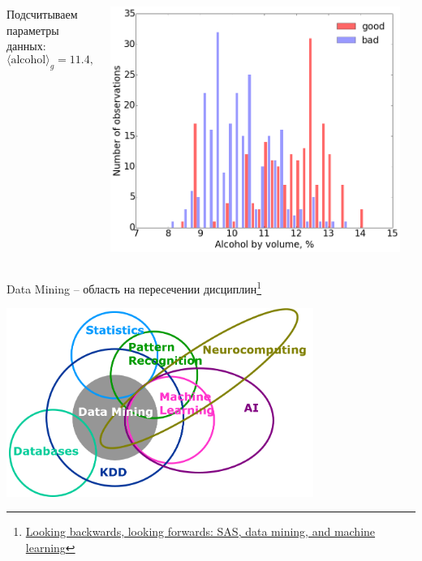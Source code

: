 \documentclass[aspectratio=169]{beamer}
\begin{document}
\begin{frame}
\begin{columns}[c]
\begin{column}{.49\linewidth}
\begin{footnotesize}
\begin{overprint}
			  Подсчитываем параметры данных: \[\langle \text{alcohol} \rangle_g = 11.4,\; \langle \text{alcohol} \rangle_b = 10.2\]
		\end{overprint}
		\end{footnotesize}
    \end{column}
    \begin{column}{.49\linewidth}
    \begin{center}
\includegraphics[width=0.95\textwidth]{images/wine.png}
\end{center}
    \end{column}
\end{columns}

\end{frame}

\begin{frame}{Data Mining -- область на пересечении дисциплин\footnote{\href{http://blogs.sas.com/content/subconsciousmusings/2014/08/22/looking-backwards-looking-forwards-sas-data-mining-and-machine-learning/}{Looking backwards, looking forwards: SAS, data mining, and machine learning}}}

\begin{center}
\includegraphics[width=0.75\textwidth]{images/data-mining-venn.png}
\end{center}

\end{frame}
\end{document}
